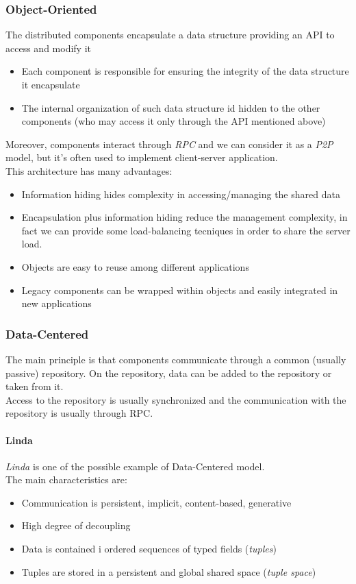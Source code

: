 \documentclass{article}
\begin{document}
    \subsubsection{Object-Oriented}
    The distributed components encapsulate a data structure providing an API to access
    and modify it
    \begin{itemize}
        \item Each component is responsible for ensuring the integrity of the data structure
            it encapsulate
        \item The internal organization of such data structure id hidden to the other components
            (who may access it only through the API mentioned above)
    \end{itemize}
    Moreover, components interact through \textit{RPC} and we can consider it as a \textit{P2P} model,
    but it's often used to implement client-server application.\\
    This architecture has many advantages:
    \begin{itemize}
        \item Information hiding hides complexity in accessing/managing the shared data
        \item Encapsulation plus information hiding reduce the management complexity, in fact we
            can provide some load-balancing tecniques in order to share the server load.
        \item Objects are easy to reuse among different applications
        \item Legacy components can be wrapped within objects and easily integrated in new applications
    \end{itemize}

    \subsubsection{Data-Centered}
    The main principle is that components communicate through a common (usually passive) repository.
    On the repository, data can be added to the repository or taken from it.\\
    Access to the repository is usually synchronized and the communication with the 
    repository is usually through RPC.

    \paragraph{Linda}
    \textit{Linda} is one of the possible example of Data-Centered model.\\
    The main characteristics are:
    \begin{itemize}
        \item Communication is persistent, implicit, content-based, generative
        \item High degree of decoupling
        \item Data is contained i ordered sequences of typed fields (\textit{tuples})
        \item Tuples are stored in a persistent and global shared space (\textit{tuple space})
    \end{itemize}
\end{document}
